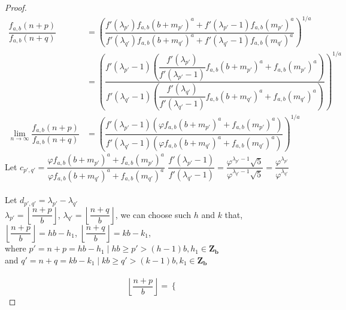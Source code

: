 \documentclass[preprint,12pt]{elsarticle}
\begin{document}
\begin{proof}
	\begin{align*}
		\dfrac{f_{a,b}(n+p)}{f_{a,b}(n+q)}                    & = \left(\dfrac{f'(\lambda_{p'})f_{a,b}(b+m_{p'})^a + f'(\lambda_{p'}-1)f_{a,b}(m_{p'})^a}{f'(\lambda_{q'})f_{a,b}(b+m_{q'})^a + f'(\lambda_{q'}-1)f_{a,b}(m_{q'})^a}\right)^{1/a}                                                                                   \\
		                                                      & = \left(\dfrac{f'(\lambda_{p'}-1)\left(\dfrac{f'(\lambda_{p'})}{f'(\lambda_{p'}-1)}f_{a,b}(b+m_{p'})^a + f_{a,b}(m_{p'})^a\right)}{f'(\lambda_{q'}-1)\left(\dfrac{f'(\lambda_{q'})}{f'(\lambda_{q'}-1)}f_{a,b}(b+m_{q'})^a + f_{a,b}(m_{q'})^a\right)}\right)^{1/a} \\
		\lim_{n \to \infty}\dfrac{f_{a,b}(n+p)}{f_{a,b}(n+q)} & =                                                                                                                                                                                                                                                                   
		\left(\dfrac{f'(\lambda_{p'}-1)\left(\varphi f_{a,b}(b+m_{p'})^a + f_{a,b}(m_{p'})^a\right)}{f'(\lambda_{q'}-1)\left(\varphi f_{a,b}(b+m_{q'})^a + f_{a,b}(m_{q'})^a\right)}\right)^{1/a}
	\end{align*}
	Let $c_{p',q'} = \dfrac{\varphi f_{a,b}(b+m_{p'})^a + f_{a,b}(m_{p'})^a}{\varphi f_{a,b}(b+m_{q'})^a + f_{a,b}(m_{q'})^a}$
	\clearpage
	$\dfrac{f'(\lambda_{p'} - 1)}{f'(\lambda_{q'} - 1)} = \dfrac{\varphi^{\lambda_{p'} - 1}\sqrt{5}}{\varphi^{\lambda_{q'} - 1}\sqrt{5}} = \dfrac{\varphi^{\lambda_{p'}}}{\varphi^{\lambda_{q'}}}$\\\\
	Let $d_{p', q'} = \lambda_{p'} - \lambda_{q'}$\\
	$\lambda_{p'} = \left\lfloor\dfrac{n + p}{b}\right\rfloor$, $\lambda_{q'} = \left\lfloor\dfrac{n + q}{b}\right\rfloor$, we can choose such $h$ and $k$ that,\\
	$\left\lfloor\dfrac{n + p}{b}\right\rfloor = hb - h_1$, $\left\lfloor\dfrac{n + q}{b}\right\rfloor = kb - k_1$,\\where $p'= n + p = hb - h_1 \mid hb \geq p' > (h-1)b, h_1\in\mathbf{Z_b}$\\
	and $q' = n + q = kb - k_1 \mid kb \geq q' > (k-1)b, k_1\in\mathbf{Z_b}$\\\\
	\begin{equation*}
		\left\lfloor\dfrac{n + p}{b}\right\rfloor = \begin{cases}

\end{cases}
\end{equation*}
\end{proof}
\end{document}
